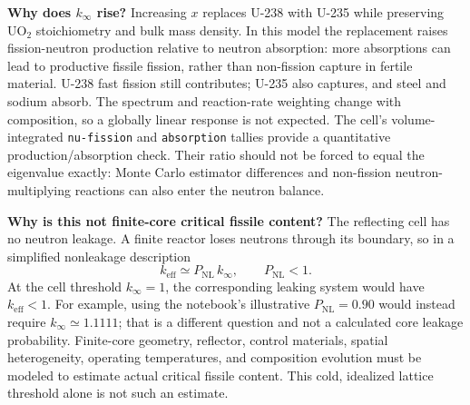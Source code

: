 \begin{draftsolution}
\textbf{Why does $k_\infty$ rise?}
Increasing $x$ replaces U-238 with U-235 while preserving UO$_2$
stoichiometry and bulk mass density. In this model the replacement raises
fission-neutron production relative to neutron absorption: more absorptions
can lead to productive fissile fission, rather than non-fission capture in
fertile material. U-238 fast fission still contributes; U-235 also captures,
and steel and sodium absorb. The spectrum and reaction-rate weighting
change with composition, so a globally linear response is not expected.
The cell's volume-integrated \texttt{nu-fission} and \texttt{absorption}
tallies provide a quantitative production/absorption check. Their ratio
should not be forced to equal the eigenvalue exactly: Monte Carlo
estimator differences and non-fission neutron-multiplying reactions can
also enter the neutron balance.

\textbf{Why is this not finite-core critical fissile content?}
The reflecting cell has no neutron leakage. A finite reactor loses
neutrons through its boundary, so in a simplified nonleakage description
\[
 k_{\mathrm{eff}}\simeq P_{\mathrm{NL}}\,k_\infty,
 \qquad P_{\mathrm{NL}}<1.
\]
At the cell threshold $k_\infty=1$, the corresponding leaking system would
have $k_{\mathrm{eff}}<1$. For example, using the notebook's illustrative
$P_{\mathrm{NL}}=0.90$ would instead require $k_\infty\simeq1.1111$;
that is a different question and not a calculated core leakage probability.
Finite-core geometry, reflector, control materials, spatial heterogeneity,
operating temperatures, and composition evolution must be modeled to
estimate actual critical fissile content. This cold, idealized lattice
threshold alone is not such an estimate.

\end{draftsolution}

\clearpage
\endgroup
